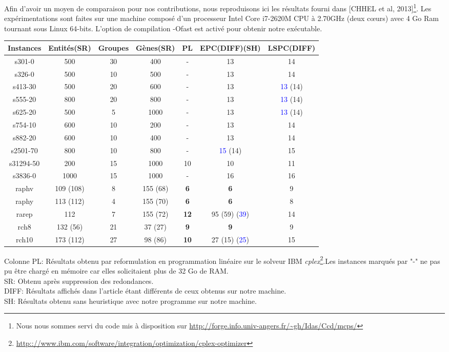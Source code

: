 Afin d'avoir un moyen de comparaison pour nos contributions, nous reproduisons ici les résultats fourni dans [CHHEL et al, 2013]\footnote{Nous nous sommes servi du code mis à disposition sur \url{http://forge.info.univ-angers.fr/~gh/Idas/Ccd/mcps/}}. Les expérimentations sont faites sur une machine composé d'un processeur Intel Core i7-2620M CPU à 2.70GHz (deux cœurs) avec 4 Go Ram tournant sous Linux 64-bits. L'option de compilation -Ofast est activé pour obtenir notre exécutable.
\begin{center}
\begin{tabular}{|c|c|c|c|c|c|c|}
\hline 
Instances & Entités(SR) & Groupes & Gènes(SR) & PL & EPC(DIFF)(SH) & LSPC(DIFF) \\ 
\hline 
s301-0 & 500 & 30 & 400 & - & 13 & 14 \\ 
\hline 
s326-0 & 500 & 10 & 500 & - & 13 & 14 \\ 
\hline 
s413-30 & 500 & 20 & 600 & - & 13 & \textcolor{blue}{13} (14) \\ 
\hline 
s555-20 & 800 & 20 & 800 & - & 13 & \textcolor{blue}{13} (14) \\ 
\hline 
s625-20 & 500 & 5 & 1000 & - & 13 & \textcolor{blue}{13} (14) \\ 
\hline 
s754-10 & 600 & 10 & 200 & - & 13 & 14 \\ 
\hline 
s882-20 & 600 & 10 & 400 & - & 13 & 14 \\ 
\hline 
s2501-70 & 800 & 10 & 800 & - & \textcolor{blue}{15} (14) & 15 \\ 
\hline 
s31294-50 & 200 & 15 & 1000 & 10 & 10 & 11 \\ 
\hline 
s3836-0 & 1000 & 15 & 1000 & - & 16 & 16 \\ 
\hline 
raphv & 109 (108) & 8 & 155 (68) & \textbf{6} & \textbf{6} & 9 \\ 
\hline 
raphy & 113 (112) & 4 & 155 (70) & \textbf{6} & \textbf{6} & 8 \\ 
\hline 
rarep & 112 & 7 & 155 (72) & \textbf{12} & 95 (59) (\textcolor{blue}{39}) & 14 \\ 
\hline 
rch8 & 132 (56) & 21 & 37 (27) & \textbf{9} & \textbf{9} & 9 \\ 
\hline 
rch10 & 173 (112) & 27 & 98 (86) & \textbf{10} & 27 (15) (\textcolor{blue}{25}) & 15 \\ 
\hline 
\end{tabular} 
\end{center}
Colonne PL: Résultats obtenu par reformulation en programmation linéaire sur le solveur IBM \textit{cplex}\footnote{\url{http:://www.ibm.com/software/integration/optimization/cplex-optimizer}}.Les instances marqués par "-" ne pas pu être chargé en mémoire car elles solicitaient plus de 32 Go de RAM.\\
SR: Obtenu après suppression des redondances.\\
DIFF: Résultats affichés dans l'article étant différents de ceux obtenus sur notre machine.\\
SH: Résultats obtenu sans heuristique avec notre programme sur notre machine.\\


